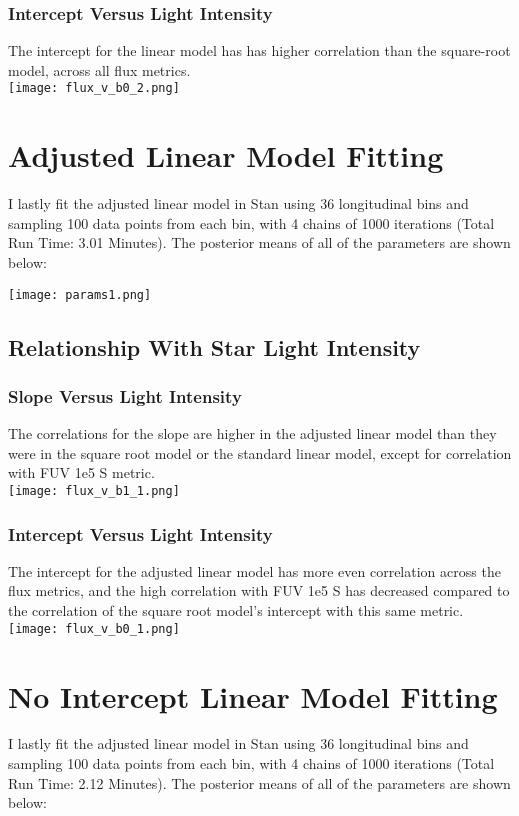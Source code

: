 \documentclass[12pt]{article}
\begin{document}
\pagebreak
\subsubsection{Intercept Versus Light Intensity}
The intercept for the linear model has has higher correlation than the square-root model, across all flux metrics.\\
\indent\indent \texttt{[image: flux\_v\_b0\_2.png]}

\pagebreak
\section{Adjusted Linear Model Fitting}
I lastly fit the adjusted linear model in Stan using 36 longitudinal bins and sampling 100 data points from each bin, with 4 chains of 1000 iterations (Total Run Time: 3.01 Minutes).  The posterior means of all of the parameters are shown below:

\indent\indent \texttt{[image: params1.png]}

\pagebreak
\subsection{Relationship With Star Light Intensity}

\subsubsection{Slope Versus Light Intensity}
The correlations for the slope are higher in the adjusted linear model than they were in the square root model or the standard linear model, except for correlation with FUV 1e5 S metric.\\
\indent\indent \texttt{[image: flux\_v\_b1\_1.png]}

\pagebreak
\subsubsection{Intercept Versus Light Intensity}
The intercept for the adjusted linear model has more even correlation across the flux metrics, and the high correlation with FUV 1e5 S has decreased compared to the correlation of the square root model's intercept with this same metric.\\
\indent\indent \texttt{[image: flux\_v\_b0\_1.png]}

\pagebreak
\section{No Intercept Linear Model Fitting}
I lastly fit the adjusted linear model in Stan using 36 longitudinal bins and sampling 100 data points from each bin, with 4 chains of 1000 iterations (Total Run Time: 2.12 Minutes).  The posterior means of all of the parameters are shown below:
\end{document}
